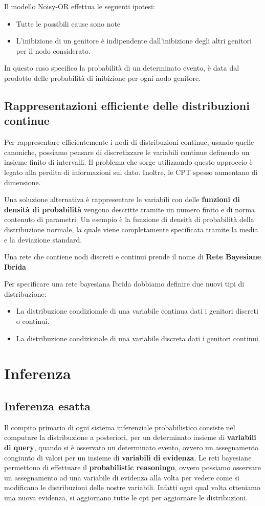 Il modello Noisy-OR effettua le seguenti ipotesi:
\begin{itemize}
    \item Tutte le possibili cause sono note
    \item L'inibizione di un genitore è indipendente dall'inibizione degli altri
          genitori per il nodo considerato.
\end{itemize}
In questo caso specifico la probabilità di un determinato evento, è data dal
prodotto delle probabilità di inibizione per ogni nodo genitore.

\subsection{Rappresentazioni efficiente delle distribuzioni continue}
Per rappresentare efficientemente i nodi di distribuzioni continue, usando quelle
canoniche, possiamo pensare di discretizzare le variabili continue definendo un
insieme finito di intervalli. Il problema che sorge utilizzando questo approccio
è legato alla perdita di informazioni sul dato. Inoltre, le CPT spesso aumentano
di dimensione.

Una soluzione alternativa è rappresentare le variabili con delle \textbf{funzioni
    di densità di probabilità} vengono descritte tramite un numero finito e di
norma contenuto di parametri. Un esempio è la funzione di densità di probabilità
della distribuzione normale, la quale viene completamente specificata tramite
la media e la deviazione standard.
\begin{definizione}
    Una rete che contiene nodi discreti e continui prende il nome di \textbf{Rete
        Bayesiane Ibrida}
\end{definizione}
Per specificare una rete bayesiana Ibrida dobbiamo definire due nuovi tipi di
distribuzione:
\begin{itemize}
    \item La distribuzione condizionale di una variabile continua dati i genitori
          discreti o continui.
    \item La distribuzione condizionale di una variabile discreta dati i genitori
          continui.
\end{itemize}
\section{Inferenza}
\subsection{Inferenza esatta}
Il compito primario di ogni sistema inferenziale probabilistico consiste nel
computare la distribuzione a posteriori, per un determinato insieme di \textbf{variabili
    di query}, quando si è osservato un determinato evento, ovvero un assegnamento
congiunto di valori per un insieme di \textbf{variabili di evidenza}.
Le reti bayesiane permettono di effettuare il \textbf{probabilistic reasoningo}, ovvero
possiamo osservare un assegnamento ad una variabile di evidenza alla volta per 
vedere come si modificano le distribuzioni delle nostre variabili. Infatti ogni 
qual volta otteniamo una nuova evidenza, si aggiornano tutte le cpt per aggiornare 
le distribuzioni.

